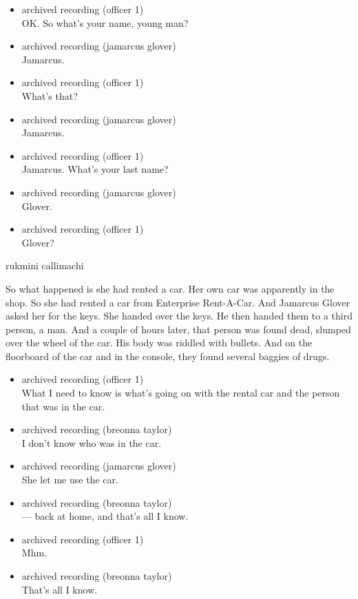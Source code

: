 \begin{itemize}
\item
  archived recording (officer 1)\\
  OK. So what's your name, young man?
\item
  archived recording (jamarcus glover)\\
  Jamarcus.
\item
  archived recording (officer 1)\\
  What's that?
\item
  archived recording (jamarcus glover)\\
  Jamarcus.
\item
  archived recording (officer 1)\\
  Jamarcus. What's your last name?
\item
  archived recording (jamarcus glover)\\
  Glover.
\item
  archived recording (officer 1)\\
  Glover?
\end{itemize}

rukmini callimachi

So what happened is she had rented a car. Her own car was apparently in
the shop. So she had rented a car from Enterprise Rent-A-Car. And
Jamarcus Glover asked her for the keys. She handed over the keys. He
then handed them to a third person, a man. And a couple of hours later,
that person was found dead, slumped over the wheel of the car. His body
was riddled with bullets. And on the floorboard of the car and in the
console, they found several baggies of drugs.

\begin{itemize}
\item
  archived recording (officer 1)\\
  What I need to know is what's going on with the rental car and the
  person that was in the car.
\item
  archived recording (breonna taylor)\\
  I don't know who was in the car.
\item
  archived recording (jamarcus glover)\\
  She let me use the car.
\item
  archived recording (breonna taylor)\\
  --- back at home, and that's all I know.
\item
  archived recording (officer 1)\\
  Mhm.
\item
  archived recording (breonna taylor)\\
  That's all I know.
\end{itemize}

